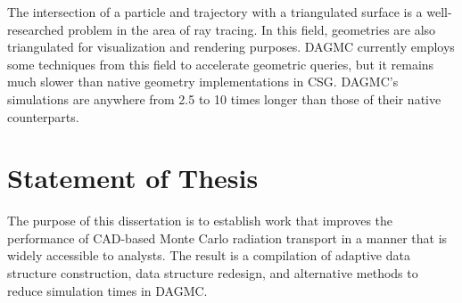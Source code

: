 The intersection of a particle and trajectory with a triangulated surface is a
well-researched problem in the area of ray tracing. In this field, geometries
are also triangulated for visualization and rendering purposes. DAGMC currently
employs some techniques from this field to accelerate geometric queries, but it
remains much slower than native geometry implementations in CSG. DAGMC's
simulations are anywhere from 2.5 to 10 times longer than those of their native
counterparts.

\newpage
\section{Statement of Thesis}

The purpose of this dissertation is to establish work that improves the
performance of CAD-based Monte Carlo radiation transport in a manner that is
widely accessible to analysts. The result is a compilation of adaptive data
structure construction, data structure redesign, and alternative methods to
reduce simulation times in DAGMC.



